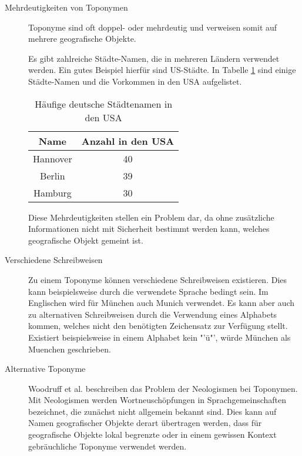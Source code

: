			\begin{description}

				\item[Mehrdeutigkeiten von Toponymen]

					Toponyme sind oft doppel- oder mehrdeutig und verweisen somit auf mehrere geografische Objekte.
				
					Es gibt zahlreiche Städte-Namen, die in mehreren Ländern verwendet werden.
					Ein gutes Beispiel hierfür sind US-Städte. 
					In Tabelle \ref{tab:usCitiesGermanNames} sind einige Städte-Namen und die Vorkommen in den USA aufgelistet.
					
					\begin{table}[htpb]
						\caption{Häufige deutsche Städtenamen in den USA} 
						\centering
						\begin{tabular}{|c|c|}
							\hline
							Name & Anzahl in den USA \\
							\hline\hline
							Hannover & 40 \\
							\hline
							Berlin & 39 \\
							\hline
							Hamburg & 30 \\
							\hline
						\end{tabular}
						\label{tab:usCitiesGermanNames} 
					\end{table}

					Diese Mehrdeutigkeiten stellen ein Problem dar, da ohne zusätzliche Informationen nicht mit Sicherheit bestimmt werden kann, welches geografische Objekt gemeint ist.
					
				\item [Verschiedene Schreibweisen]

					Zu einem Toponyme können verschiedene Schreibweisen existieren. 
					Dies kann beispielsweise durch die verwendete Sprache bedingt sein.
					Im Englischen wird für München auch Munich verwendet.
					Es kann aber auch zu alternativen Schreibweisen durch die Verwendung eines Alphabets kommen, welches nicht den benötigten Zeichensatz zur Verfügung stellt.
					Existiert beispielsweise in einem Alphabet kein "'ü"', würde München als Muenchen geschrieben.  

			  	\item [Alternative Toponyme]

			  		Woodruff et al. beschreiben das Problem der Neologismen bei Toponymen. 
			  		Mit Neologismen werden Wortneuschöpfungen in Sprachgemeinschaften bezeichnet, die zunächst nicht allgemein bekannt sind. 
			  		Dies kann auf Namen geografischer Objekte derart übertragen werden, dass für geografische Objekte lokal begrenzte oder in einem gewissen Kontext gebräuchliche Toponyme verwendet werden.


\end{description}
